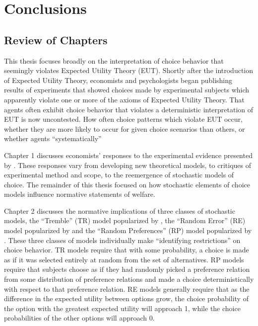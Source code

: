 \documentclass[../main.tex]{subfiles}
\begin{document}
\doublespacing
\setcounter{chapter}{4}

\chapter{Conclusions}

\lltoc %

\section{Review of Chapters}

This thesis focuses broadly on the interpretation of choice behavior that seemingly violates Expected Utility Theory (EUT).
Shortly after the introduction of Expected Utility Theory, economists and psychologists began publishing results of experiments that showed choices made by experimental subjects which apparently violate one or more of the axioms of Expected Utility Theory.
That agents often exhibit choice behavior that violates a deterministic interpretation of EUT is now uncontested.
How often choice patterns which violate EUT occur, whether they are more likely to occur for given choice scenarios than others, or whether agents \enquote{systematically}

Chapter 1 discusses economists' responses to the experimental evidence presented by \textcite{Grether1979}.
These responses vary from developing new theoretical models, to critiques of experimental method and scope, to the reemergence of stochastic models of choice.
The remainder of this thesis focused on how stochastic elements of choice models influence normative statements of welfare.

Chapter 2 discusses the normative implications of three classes of stochastic models, the \enquote{Tremble} (TR) model popularized by \textcite{Harless1994}, the \enquote{Random Error} (RE) model popularized by \textcite{Hey1994} and the \enquote{Random Preferences} (RP) model popularized by \textcite{Loomes1998}.
These three classes of models individually make \enquote{identifying restrictions} \parencite{Ballinger1997} on choice behavior.
TR models require that with some probability, a choice is made as if it was selected entirely at random from the set of alternatives.
RP models require that subjects choose as if they had randomly picked a preference relation from some distribution of preference relations and made a choice deterministically with respect to that preference relation.
RE models generally require that as the difference in the expected utility between options grow, the choice probability of the option with the greatest expected utility will approach 1, while the choice probabilities of the other options will approach 0.
\end{document}
